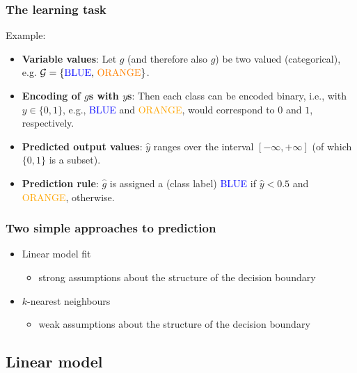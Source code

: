 \documentclass[notes]{beamer}          %
\begin{document}
\begin{frame}
\frametitle{The learning task}
    Example:
    \begin{itemize}
         \item {\bf Variable values}: Let $g$ (and therefore also $\hat{g}$) be two valued (categorical), e.g. $\cal{G} = \{ \text{\textcolor{blue}{BLUE}, \textcolor{orange}{ORANGE}}\}$.
        \item {\bf Encoding of $g$s with $y$s}: Then each class can be encoded binary, i.e., with $y \in \{0,1\}$, e.g., \textcolor{blue}{BLUE} and \textcolor{orange}{ORANGE}, would correspond to $0$ and $1$, respectively.
        \item {\bf Predicted output values}: $\hat{y}$ ranges over the interval $[-\infty,+\infty]$ (of which $\{0,1\}$ is a subset).
        \item {\bf Prediction rule}: $\hat{g}$ is assigned a (class label) \textcolor{blue}{BLUE} if $\hat{y} < 0.5$ and \textcolor{orange}{ORANGE}, otherwise.

    \end{itemize}
\end{frame}



\begin{frame}
\frametitle{Two simple approaches to prediction}
\begin{itemize}
    \item Linear model fit
        \begin{itemize}
            \item strong assumptions about the structure of the decision boundary
        \end{itemize}
    \item $k$-nearest neighbours
        \begin{itemize}
            \item weak assumptions about the structure of the decision boundary
        \end{itemize}
\end{itemize}

\end{frame}

\subsection{Linear model}
\end{document}
